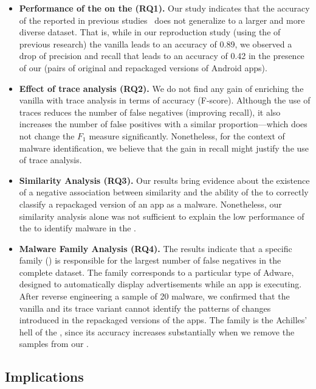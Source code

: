 \begin{itemize}
\item \textbf{Performance of the \mas on the \cds (RQ1).} 
  Our study indicates that the accuracy of the \mas reported in previous studies~\cite{DBLP:conf/wcre/BaoLL18,DBLP:journals/jss/CostaMMSSBNR22} does not
  generalize to a larger and more diverse dataset. That is, while in our
  reproduction study (using the \sds of previous research) the vanilla \mas
  leads to an accuracy of 0.89, we observed a drop of precision and recall
  that leads to an accuracy of 0.42 in the presence of our \cds (\apps pairs of
  original and repackaged versions of Android apps). 

\item \textbf{Effect of trace analysis (RQ2).} We do not find any gain of enriching the vanilla \mas with
  trace analysis in terms of accuracy (F-score). Although the use of traces
  reduces the number of false negatives (improving recall), it also increases the number of false
  positives with a similar proportion---which does not change the $F_1$ measure significantly.
  Nonetheless, for the context of malware identification, we believe that the
  gain in recall might justify the use of trace analysis.

\item \textbf{Similarity Analysis (RQ3).} Our results bring evidence about the existence of a negative
  association between similarity and the ability of the \mas to correctly
  classify a repackaged version of an app as a malware. Nonetheless,
  our similarity analysis alone was not sufficient to explain the low
  performance of the \mas to identify malware in the \cds.

\item \textbf{Malware Family Analysis (RQ4).} The results indicate that a specific family
  (\gps)  is responsible for the largest number of false
  negatives in the complete dataset. The \gps family corresponds to a particular type of
  Adware, designed to automatically display advertisements while an app is executing. After reverse engineering
  a sample of 20 \gps malware, we confirmed that the vanilla \mas and its trace variant cannot identify the
  patterns of changes introduced in the repackaged versions of the apps. The \gps family
  is the Achilles' hell of the \mas, since its accuracy increases substantially
  when we remove the \gps samples from our \cds.  
\end{itemize}


\subsection{Implications}\label{sec:implications} 

